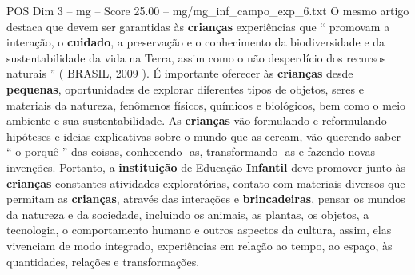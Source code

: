 \begin{textsample}{POS Dim 3 – mg – Score 25.00 – mg/mg\_inf\_campo\_exp\_6.txt}
O mesmo artigo destaca que devem ser garantidas às \textbf{crianças} experiências que “ promovam a interação, o \textbf{cuidado}, a preservação e o conhecimento da biodiversidade e da sustentabilidade da vida na Terra, assim como o não desperdício dos recursos naturais ” ( BRASIL, 2009 ).
É importante oferecer às \textbf{crianças} desde \textbf{pequenas}, oportunidades de explorar diferentes tipos de objetos, seres e materiais da natureza, fenômenos físicos, químicos e biológicos, bem como o meio ambiente e sua sustentabilidade.
As \textbf{crianças} vão formulando e reformulando hipóteses e ideias explicativas sobre o mundo que as cercam, vão querendo saber “ o porquê ” das coisas, conhecendo -as, transformando -as e fazendo novas invenções.
Portanto, a \textbf{instituição} de Educação \textbf{Infantil} deve promover junto às \textbf{crianças} constantes atividades exploratórias, contato com materiais diversos que permitam as \textbf{crianças}, através das interações e \textbf{brincadeiras}, pensar os mundos da natureza e da sociedade, incluindo os animais, as plantas, os objetos, a tecnologia, o comportamento humano e outros aspectos da cultura, assim, elas vivenciam de modo integrado, experiências em relação ao tempo, ao espaço, às quantidades, relações e transformações.

\end{textsample}
